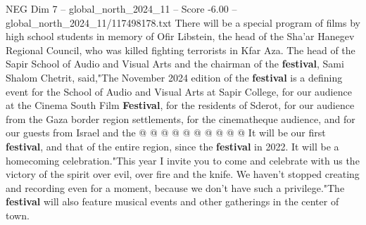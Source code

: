 \begin{textsample}{NEG Dim 7 – global\_north\_2024\_11 – Score -6.00 – global\_north\_2024\_11/117498178.txt}
There will be a special program of films by high school students in memory of Ofir Libstein, the head of the Sha'ar Hanegev Regional Council, who was killed fighting terrorists in Kfar Aza.
The head of the Sapir School of Audio and Visual Arts and the chairman of the \textbf{festival}, Sami Shalom Chetrit, said,"The November 2024 edition of the \textbf{festival} is a defining event for the School of Audio and Visual Arts at Sapir College, for our audience at the Cinema South Film \textbf{Festival}, for the residents of Sderot, for our audience from the Gaza border region settlements, for the cinematheque audience, and for our guests from Israel and the @ @ @ @ @ @ @ @ @ @ It will be our first \textbf{festival}, and that of the entire region, since the \textbf{festival} in 2022.
It will be a homecoming celebration."This year I invite you to come and celebrate with us the victory of the spirit over evil, over fire and the knife.
We haven't stopped creating and recording even for a moment, because we don't have such a privilege."The \textbf{festival} will also feature musical events and other gatherings in the center of town.

\end{textsample}
